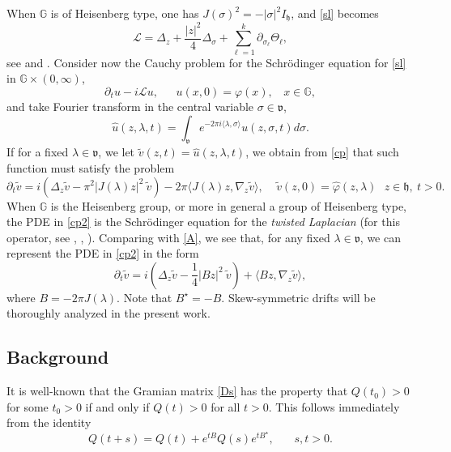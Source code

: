 \documentclass[11pt,letter]{amsart}
\def \vf{\varphi}
\newcommand{\p}{\partial}
\newcommand{\bG}{\mathbb {G}}
\newcommand{\la}{\lambda}
\numberwithin{equation}{section}
\newcommand{\sa}{\langle}
\numberwithin{equation}{section}
\begin{document}
When $\bG$ is of Heisenberg type, one has $J(\sigma)^2 = - |\sigma|^2 I_{\mathfrak h}$, and \eqref{sl} becomes
\[
\mathscr L = \Delta_z + \frac{|z|^2}4 \Delta_\sigma  + \sum_{\ell = 1}^k \p_{\sigma_\ell} \Theta_\ell,
\]
see \cite{Ka} and \cite{CDKR}. 
Consider now the Cauchy problem for the Schr\"odinger equation for \eqref{sl} in $\bG\times (0,\infty)$,
\begin{equation}\label{cp}
\p_t u - i \mathscr L u,\ \ \ \ \ \ \ u(x,0) = \vf(x),\ \  \ \ x\in \bG,
\end{equation}
and take Fourier transform in the central variable $\sigma\in \mathfrak v$, 
\[
\hat u(z,\la,t) = \int_{\mathfrak v} e^{-2\pi i\langle\la,\sigma\rangle} u(z,\sigma,t) d\sigma.
\]
If for a fixed $\la\in \mathfrak v$, we let $\tilde v(z,t) = \hat u(z,\la,t)$, we obtain from \eqref{cp} that such function must satisfy the problem
\begin{equation}\label{cp2}
\p_t \tilde v  = i\left(\Delta_z \tilde v  - \pi^2 |J(\la)z|^2\ \tilde v\right) - 2 \pi  \langle J(\la) z, \nabla_z \tilde v\rangle,
\ \ \ \ \ 
\tilde v(z,0) = \hat \vf(z,\la) \ \ \  z\in \mathfrak h,\ t>0.
\end{equation}
When $\bG$ is the Heisenberg group, or more in general a group of Heisenberg type, the PDE in \eqref{cp2} is the Schr\"odinger equation for the \emph{twisted Laplacian} (for this operator, see \cite{Fo}, \cite{Strjfa}, \cite{Veluma}).
Comparing with \eqref{A}, we see that, for any fixed $\la\in \mathfrak v$, we can represent the PDE in \eqref{cp2} in the form
\begin{equation}\label{cp3}
\p_t \tilde v  = i\left(\Delta_z \tilde v  - \frac{1}4|Bz|^2\ \tilde v\right) +\sa B z, \nabla_z \tilde v\rangle,
\end{equation}
where $B =   
- 2 \pi J(\la)$.  Note that $B^\star = - B$. Skew-symmetric drifts will be thoroughly analyzed in the present work.

\vskip 0.2in

\subsection{Background} It is well-known that the Gramian matrix \eqref{Ds} 
has the property that $Q(t_0) >0$ for some $t_0>0$ if and only if  $Q(t)>0$ for all $t>0$. This follows immediately from the identity 
\begin{equation}\label{mono}
Q(t+s) = Q(t) + e^{tB} Q(s) e^{tB^\star},\ \ \ \ \ \ \ \ s, t >0.
\end{equation}
\end{document}
